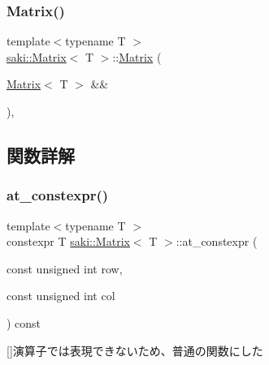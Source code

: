 \mbox{\label{classsaki_1_1_matrix_aced6f31e05917c2c41305dd0be082f8b}} 
\subsubsection{\texorpdfstring{Matrix()}{Matrix()}\hspace{0.1cm}{\footnotesize\ttfamily [5/5]}}
{\footnotesize\ttfamily template$<$typename T $>$ \\
\mbox{\hyperlink{classsaki_1_1_matrix}{saki\+::\+Matrix}}$<$ T $>$\+::\mbox{\hyperlink{classsaki_1_1_matrix}{Matrix}} (\begin{DoxyParamCaption}\item[{\mbox{\hyperlink{classsaki_1_1_matrix}{Matrix}}$<$ T $>$ \&\&}]{ }\end{DoxyParamCaption})\hspace{0.3cm}{\ttfamily [default]}, {\ttfamily [noexcept]}}



\subsection{関数詳解}
\mbox{\label{classsaki_1_1_matrix_ac9e6609628221255fd9577eceb9ab2af}} 
\subsubsection{\texorpdfstring{at\+\_\+constexpr()}{at\_constexpr()}}
{\footnotesize\ttfamily template$<$typename T $>$ \\
constexpr T \mbox{\hyperlink{classsaki_1_1_matrix}{saki\+::\+Matrix}}$<$ T $>$\+::at\+\_\+constexpr (\begin{DoxyParamCaption}\item[{const unsigned int}]{row,  }\item[{const unsigned int}]{col }\end{DoxyParamCaption}) const\hspace{0.3cm}{\ttfamily [inline]}}



\mbox{[}\mbox{]}演算子では表現できないため、普通の関数にした 


